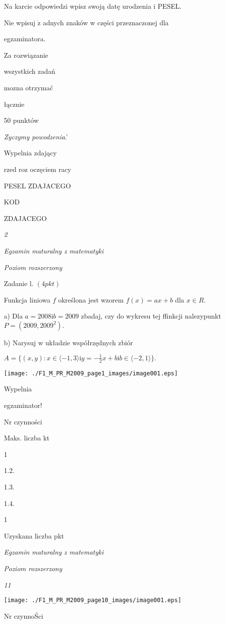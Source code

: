 \documentclass[a4paper,12pt]{article}
\begin{document}
Na karcie odpowiedzi wpisz swoją datę urodzenia i PESEL.

Nie wpisuj $\dot{\mathrm{z}}$ adnych znaków w części przeznaczonej dla

egzaminatora.

Za rozwiązanie

wszystkich zadań

mozna otrzymać

łącznie

50 punktów

{\it Zyczymy powodzenia}.'

Wypelnia zdający

rzed roz oczęciem racy

PESEL ZDAJACEGO

KOD

ZDAJACEGO




{\it 2}

{\it Egzamin maturalny z matematyki}

{\it Poziom rozszerzony}

Zadanie l. $(4pkt)$

Funkcja liniowa $f$ określona jest wzorem $f(x)=ax+b$ dla $x\in R.$

a) Dla $a=2008\mathrm{i}b=2009$ zbadaj, czy do wykresu tej ffinkcji nalezypunkt $P=(2009,2009^{2}).$

b) Narysuj w układzie współrzędnych zbiór

$A=\displaystyle \{(x,y):x\in\langle-1,3\rangle\mathrm{i}y=-\frac{1}{2}x+b\mathrm{i}b\in\langle-2,1\rangle\}.$
\begin{center}
\texttt{[image: ./F1\_M\_PR\_M2009\_page1\_images/image001.eps]}
\end{center}
Wypelnia

egzaminator!

Nr czynności

Maks. liczba kt

1

1.2.

1.3.

1.4.

1

Uzyskana liczba pkt





{\it Egzamin maturalny z matematyki}

{\it Poziom rozszerzony}

{\it 11}
\begin{center}
\texttt{[image: ./F1\_M\_PR\_M2009\_page10\_images/image001.eps]}
\end{center}
Nr czynnoŚci
\end{document}
